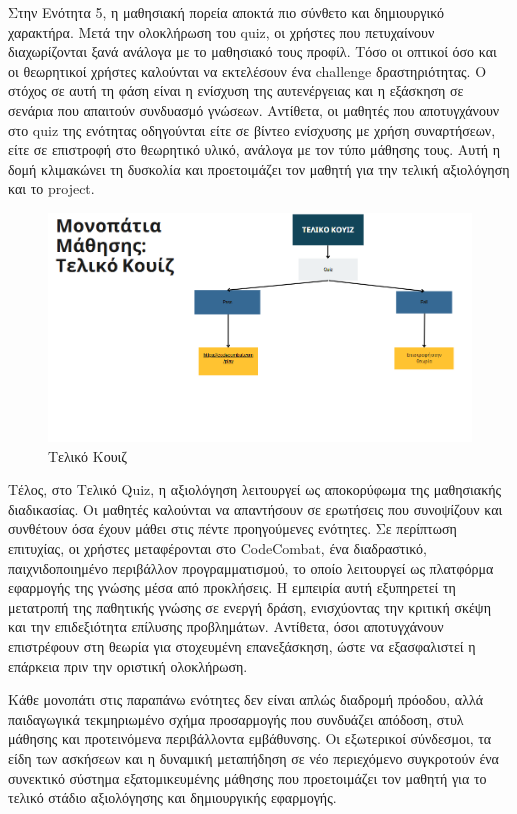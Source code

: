 \documentclass[11pt]{report}
\begin{document}
Στην Ενότητα 5, η μαθησιακή πορεία αποκτά πιο σύνθετο και δημιουργικό χαρακτήρα. Μετά την ολοκλήρωση του quiz, οι χρήστες που πετυχαίνουν διαχωρίζονται ξανά ανάλογα με το μαθησιακό τους προφίλ. Τόσο οι οπτικοί όσο και οι θεωρητικοί χρήστες καλούνται να εκτελέσουν ένα challenge δραστηριότητας. Ο στόχος σε αυτή τη φάση είναι η ενίσχυση της αυτενέργειας και η εξάσκηση σε σενάρια που απαιτούν συνδυασμό γνώσεων. Αντίθετα, οι μαθητές που αποτυγχάνουν στο quiz της ενότητας οδηγούνται είτε σε βίντεο ενίσχυσης με χρήση συναρτήσεων, είτε σε επιστροφή στο θεωρητικό υλικό, ανάλογα με τον τύπο μάθησης τους. Αυτή η δομή κλιμακώνει τη δυσκολία και προετοιμάζει τον μαθητή για την τελική αξιολόγηση και το project. 

\begin{figure}[H]
    \centering
    \includegraphics[width=0.9\linewidth]{Figures/image011.png}
    \caption{Τελικό Κουιζ}
    \label{fig:enter-label}
\end{figure}

Τέλος, στο Τελικό Quiz, η αξιολόγηση λειτουργεί ως αποκορύφωμα της μαθησιακής διαδικασίας. Οι μαθητές καλούνται να απαντήσουν σε ερωτήσεις που συνοψίζουν και συνθέτουν όσα έχουν μάθει στις πέντε προηγούμενες ενότητες. Σε περίπτωση επιτυχίας, οι χρήστες μεταφέρονται στο CodeCombat, ένα διαδραστικό, παιχνιδοποιημένο περιβάλλον προγραμματισμού, το οποίο λειτουργεί ως πλατφόρμα εφαρμογής της γνώσης μέσα από προκλήσεις. Η εμπειρία αυτή εξυπηρετεί τη μετατροπή της παθητικής γνώσης σε ενεργή δράση, ενισχύοντας την κριτική σκέψη και την επιδεξιότητα επίλυσης προβλημάτων. Αντίθετα, όσοι αποτυγχάνουν επιστρέφουν στη θεωρία για στοχευμένη επανεξάσκηση, ώστε να εξασφαλιστεί η επάρκεια πριν την οριστική ολοκλήρωση. 

Κάθε μονοπάτι στις παραπάνω ενότητες δεν είναι απλώς διαδρομή πρόοδου, αλλά παιδαγωγικά τεκμηριωμένο σχήμα προσαρμογής που συνδυάζει απόδοση, στυλ μάθησης και προτεινόμενα περιβάλλοντα εμβάθυνσης. Οι εξωτερικοί σύνδεσμοι, τα είδη των ασκήσεων και η δυναμική μεταπήδηση σε νέο περιεχόμενο συγκροτούν ένα συνεκτικό σύστημα εξατομικευμένης μάθησης που προετοιμάζει τον μαθητή για το τελικό στάδιο αξιολόγησης και δημιουργικής εφαρμογής. 
\end{document}
